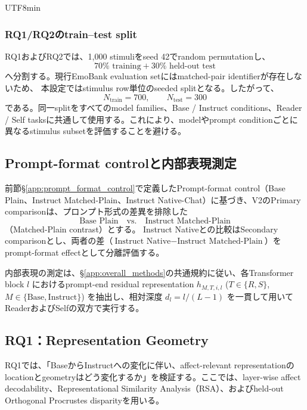 \documentclass{article} %
\begin{document}
\begin{CJK*}{UTF8}{min}
\subsubsection{RQ1/RQ2のtrain--test split}

RQ1およびRQ2では、1,000 stimuliをseed 42でrandom permutationし、
\[
70\%\text{ training}
+
30\%\text{ held-out test}
\]
へ分割する。現行EmoBank evaluation setにはmatched-pair identifierが存在しないため、
本設定ではstimulus row単位のseeded splitとなる。したがって、
\[
N_{\mathrm{train}}=700,
\qquad
N_{\mathrm{test}}=300
\]
である。同一splitをすべてのmodel families、Base / Instruct conditions、Reader / Self tasksに共通して使用する。これにより、modelやprompt conditionごとに異なるstimulus subsetを評価することを避ける。


\subsection{Prompt-format controlと内部表現測定}
\label{app:v2-prompt-control}

前節\S\ref{app:prompt_format_control}で定義したPrompt-format control（Base Plain、Instruct Matched-Plain、Instruct Native-Chat）に基づき、V2のPrimary comparisonは、プロンプト形式の差異を排除した
\[
\text{Base Plain} \quad\text{vs.}\quad \text{Instruct Matched-Plain}
\]
（Matched-Plain contrast）とする。
Instruct Nativeとの比較はSecondary comparisonとし、両者の差（$\text{Instruct Native} - \text{Instruct Matched-Plain}$）をprompt-format effectとして分離評価する。

内部表現の測定は、\S\ref{app:overall_methods}の共通規約に従い、各Transformer block $l$ におけるprompt-end residual representation $h_{M,T,i,l}$ ($T \in \{R, S\}$, $M \in \{\text{Base}, \text{Instruct}\}$) を抽出し、相対深度 $d_l = l/(L-1)$ を一貫して用いてReaderおよびSelfの双方で実行する。



\subsection{RQ1：Representation Geometry}
\label{app:v2-rq1}

RQ1では、「BaseからInstructへの変化に伴い、affect-relevant representationのlocationとgeometryはどう変化するか」を検証する。ここでは、layer-wise affect decodability、Representational Similarity Analysis（RSA）\citep{kriegeskorte2008representational}、およびheld-out Orthogonal Procrustes disparityを用いる。



\end{CJK*}
\end{document}
